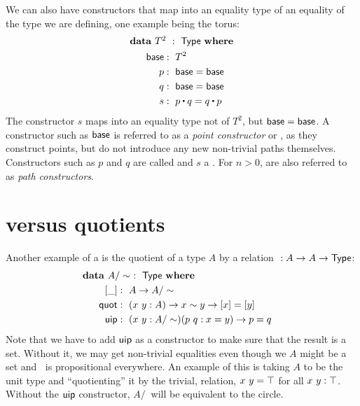 \documentclass[a4paper,10pt]{report}
\begin{document}
We can also have constructors that map into an equality type of an
equality of the type we are defining, one example being the torus:
%
\begin{alignat*}{2}
  &\rlap{$\data\ T^2\ :\ \Type\ \where$} \\
  &&\ \ \base     &:\ T^2 \\
  &&\ \ p         &:\ \base = \base \\
  &&\ \ q         &:\ \base = \base \\
  &&\ \ s         &:\ p \ct q = q \ct p
\end{alignat*}
%
The constructor $s$ maps into an equality type not of $T^2$, but
$\mathsf{base} = \mathsf{base}$. A constructor such as $\mathsf{base}$ is referred to as a
\emph{point constructor} or \emph{\zeroconstructor}, as they construct
points, but do not introduce any new non-trivial paths
themselves. Constructors such as $p$ and $q$ are called
\emph{\oneconstructors} and $s$ a \emph{}. For
$n > 0$,  are also referred to as \emph{path
  constructors}.

\section{\Hits versus quotients}
\label{sec:quotients}

Another example of a \hit is the quotient of a type $A$ by a relation
$~ : A \to A \to \mathsf{Type}$:
\begin{alignat*}{2}
  &\rlap{$\data\ A/\sim\ :\ \Type\ \where$} \\
  &&\ \ [\_]  &:\ A \to A/\sim \\
  &&\ \ \quot &:\ (x\ y : A) \to x \sim y \to [ x ] = [ y ] \\
  &&\ \ \uipc  &:\ (x\ y : A/\sim) (p\ q : x = y) \to p = q
\end{alignat*}
%
Note that we have to add $\operatorname{\mathsf{uip}}$ as a constructor to make sure that the
result is a set. Without it, we may get non-trivial equalities even
though we $A$ might be a set and $~$ is propositional everywhere. An
example of this is taking $A$ to be the unit type and ``quotienting''
it by the trivial, relation, \ie $x ~ y = \top$ for all
$x\ y : \top$. Without the $\operatorname{\mathsf{uip}}$ constructor, $A/~$ will be
equivalent to the circle.
\end{document}

